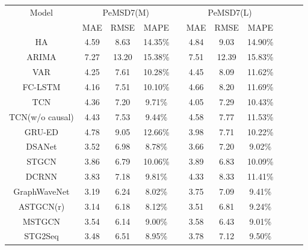 \documentclass[letterpaper]{article} \usepackage{aaai22}  \usepackage{times}  \usepackage{helvet}  \usepackage{courier}  \usepackage[hyphens]{url}  \usepackage{graphicx} \urlstyle{rm} \def\UrlFont{\rm}  \usepackage{natbib}  \usepackage{caption} \DeclareCaptionStyle{ruled}{labelfont=normalfont,labelsep=colon,strut=off} \frenchspacing  \setlength{\pdfpagewidth}{8.5in}  \setlength{\pdfpageheight}{11in}  \usepackage{stfloats}
\begin{document}
\begin{table}[!ht]
    \centering
    \setlength{\tabcolsep}{2pt}
    \small
    \begin{tabular}{ccccccc c ccc}
        \hline
        \multirow{2}{*}{Model} & \multicolumn{3}{c}{PeMSD7(M)}   && \multicolumn{3}{c}{PeMSD7(L)}     \\\cline{2-4} \cline{6-8}
                                & MAE  & RMSE  & MAPE           && MAE  & RMSE  & MAPE               \\ \hline
        HA                      & 4.59 &  8.63 & 14.35\%        && 4.84 &  9.03 & 14.90\%         \\       
        ARIMA                   & 7.27 & 13.20 & 15.38\%        && 7.51 & 12.39 & 15.83\%         \\        
        VAR                     & 4.25 &  7.61 & 10.28\%        && 4.45 &  8.09 & 11.62\%         \\                     
        FC-LSTM                 & 4.16 &  7.51 & 10.10\%        && 4.66 &  8.20 & 11.69\%         \\               
        TCN                     & 4.36 &  7.20 &  9.71\%        && 4.05 &  7.29 & 10.43\%         \\               
        TCN(w/o causal)         & 4.43 &  7.53 &  9.44\%        && 4.58 &  7.77 & 11.53\%         \\               
        GRU-ED                  & 4.78 &  9.05 & 12.66\%        && 3.98 &  7.71 & 10.22\%         \\       
        DSANet                  & 3.52 &  6.98 &  8.78\%        && 3.66 &  7.20 &  9.02\%         \\       
        STGCN                   & 3.86 &  6.79 & 10.06\%        && 3.89 &  6.83 & 10.09\%         \\       
        DCRNN                   & 3.83 &  7.18 &  9.81\%        && 4.33 &  8.33 & 11.41\%         \\       
        GraphWaveNet            & 3.19 &  6.24 &  8.02\%        && 3.75 &  7.09 &  9.41\%         \\       
        ASTGCN(r)               & 3.14 &  6.18 &  8.12\%        && 3.51 &  6.81 &  9.24\%         \\       
        MSTGCN                  & 3.54 &  6.14 &  9.00\%        && 3.58 &  6.43 &  9.01\%         \\       
        STG2Seq                 & 3.48 &  6.51 &  8.95\%        && 3.78 &  7.12 &  9.50\%         \\       

\end{tabular}
\end{table}
\end{document}
